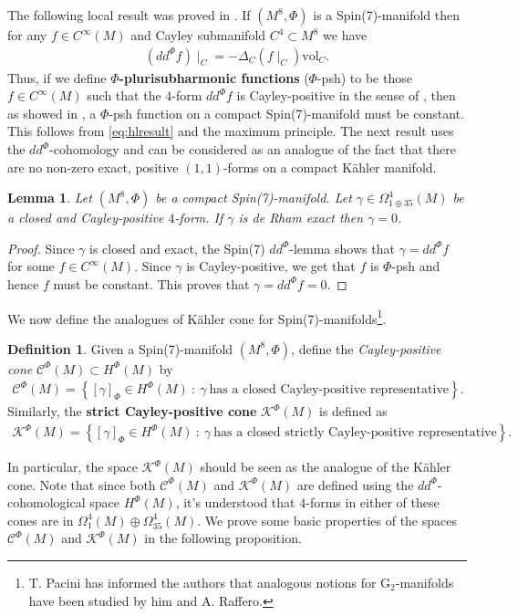 \documentclass[10pt,a4paper,reqno]{article}
\newtheorem{lemma}[theorem]{Lemma}
\theoremstyle{definition}
\newtheorem{definition}[theorem]{Definition}
\numberwithin{equation}{section}
\newcommand{\vol}{\mathrm{vol}}
\def\G2{\mathrm{G}_2}
\def\ddphi{dd^{\Phi}}
\def\cC{\mathcal{C}}
\def\cK{\mathcal{K}}
\begin{document}
The following local result was proved in \cite[Corr. 2.5]{HL-intropotential}. If $(M^8, \Phi)$ is a Spin(7)-manifold then for any $f\in C^{\infty}(M)$ and Cayley submanifold $C^4\subset M^8$ we have
\begin{align}\label{eq:hlresult}
(\ddphi f)\mid_C = -\Delta_C(f\mid_C)\vol_C.
\end{align}
Thus, if we define \textbf{$\Phi$-plurisubharmonic functions} ($\Phi$-psh) to be those $f\in C^{\infty}(M)$ such that the $4$-form $\ddphi f$ is Cayley-positive in the sense of , then as showed in \cite{HL-intropotential}, a $\Phi$-psh function on a compact Spin(7)-manifold must be constant. This follows from \cref{eq:hlresult} and the maximum principle. The next result uses the $\ddphi$-cohomology and can be considered as an analogue of the fact that there are no non-zero exact, positive $(1,1)$-forms on a compact K\"ahler manifold.

\begin{lemma}\label{lem:caypos}
Let $(M^8, \Phi)$ be a compact Spin(7)-manifold. Let $\gamma\in \Omega^4_{1\oplus 35}(M)$ be a closed and Cayley-positive $4$-form. If $\gamma$ is de Rham exact then $\gamma=0$.
\end{lemma}

\begin{proof}
Since $\gamma$ is closed and exact, the Spin(7) $\ddphi$-lemma  shows that $\gamma=\ddphi f$ for some $f\in C^{\infty}(M)$. Since $\gamma$ is Cayley-positive, we get that $f$ is $\Phi$-psh and hence $f$ must be constant. This proves that $\gamma=\ddphi f=0$.     
\end{proof}

We now define the analogues of K\"ahler cone for Spin(7)-manifolds\footnote{T. Pacini has informed the authors that analogous notions for $\G2$-manifolds have been studied by him and A. Raffero.}.

\begin{definition}\label{def:spin7cone}
Given a Spin(7)-manifold $(M^8, \Phi)$, define the \emph{Cayley-positive cone} $\cC^{\Phi}(M) \subset H^{\Phi}(M)$ by
\begin{align}
\cC^{\Phi}(M) = \left\{ [\gamma]_{\Phi}\in H^{\Phi}(M)\ :\ \gamma\ \text{has\ a\ closed\ Cayley-positive\ representative}\right\}.
\end{align}
Similarly, the \textbf{strict Cayley-positive cone} $\cK^{\Phi}(M)$ is defined as
\begin{align}
\cK^{\Phi}(M) = \left\{ [\gamma]_{\Phi}\in H^{\Phi}(M)\ :\ \gamma\ \text{has\ a\ closed\ strictly\ Cayley-positive\ representative}\right\}.
\end{align}
\end{definition}
In particular, the space $\cK^{\Phi}(M)$ should be seen as the analogue of the K\"ahler cone. Note that since both $\cC^{\Phi}(M)$ and $\cK^{\Phi}(M)$ are defined using the $\ddphi$-cohomological space $H^{\Phi}(M)$, it's understood that $4$-forms in either of these cones are in $\Omega^4_1(M)\oplus \Omega^4_{35}(M)$. We prove some basic properties of the spaces $\cC^{\Phi}(M)$ and $\cK^{\Phi}(M)$ in the following proposition.
\end{document}
